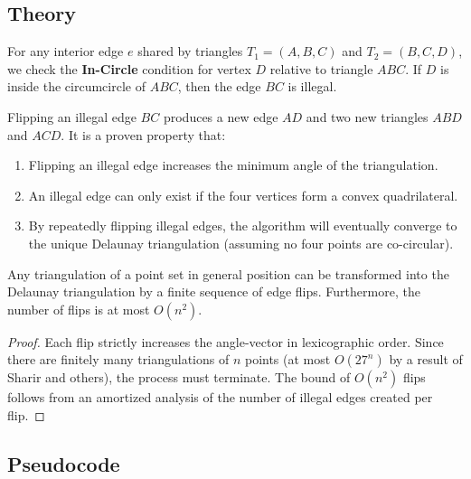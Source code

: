 \subsection{Theory}

For any interior edge $e$ shared by triangles $T_1 = (A, B, C)$ and $T_2 = (B, C, D)$, we check the \textbf{In-Circle} condition for vertex $D$ relative to triangle $ABC$. If $D$ is inside the circumcircle of $ABC$, then the edge $BC$ is illegal.

Flipping an illegal edge $BC$ produces a new edge $AD$ and two new triangles $ABD$ and $ACD$. It is a proven property that:
\begin{enumerate}
\item Flipping an illegal edge increases the minimum angle of the triangulation.
\item An illegal edge can only exist if the four vertices form a convex quadrilateral.
\item By repeatedly flipping illegal edges, the algorithm will eventually converge to the unique Delaunay triangulation (assuming no four points are co-circular).
\end{enumerate}

\begin{theorem}\label{thm:lawson_flip}
Any triangulation of a point set in general position can be transformed into the Delaunay triangulation by a finite sequence of edge flips. Furthermore, the number of flips is at most $O(n^2)$.
\end{theorem}
\begin{proof}
Each flip strictly increases the angle-vector in lexicographic order. Since there are finitely many triangulations of $n$ points (at most $O(27^n)$ by a result of Sharir and others), the process must terminate. The bound of $O(n^2)$ flips follows from an amortized analysis of the number of illegal edges created per flip.
\end{proof}



\subsection{Pseudocode}

